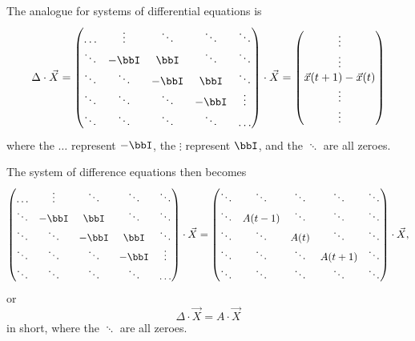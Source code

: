 \documentclass[a4paper, 12pt,oneside,openany]{book}
\begin{document}
The analogue for systems of differential equations is $$\Delta\cdot \vec{X}=\begin{pmatrix} \hdots & \vdots & \ddots & \ddots & \ddots \\ \ddots & -\bbI & \bbI & \ddots & \ddots \\ \ddots & \ddots & -\bbI & \bbI & \ddots \\ \ddots & \ddots & \ddots & -\bbI & \vdots \\ \ddots&\ddots&\ddots&\ddots&\hdots \end{pmatrix} \cdot \vec{X} = \begin{pmatrix} \vdots \\ \vdots \\ \vec{x}(t+1)-\vec{x}(t) \\ \vdots \\ \vdots \end{pmatrix}$$ where the $\hdots$ represent $-\bbI$, the $\vdots$ represent $\bbI$, and the $\ddots$ are all zeroes. 


The system of difference equations then becomes $$\begin{pmatrix} \hdots & \vdots & \ddots & \ddots & \ddots \\ \ddots & -\bbI & \bbI & \ddots & \ddots \\ \ddots & \ddots & -\bbI & \bbI & \ddots \\ \ddots & \ddots & \ddots & -\bbI & \vdots \\ \ddots&\ddots&\ddots&\ddots&\hdots \end{pmatrix} \cdot \vec{X} = \begin{pmatrix} \ddots & \ddots & \ddots & \ddots & \ddots \\ \ddots & A(t-1) & \ddots & \ddots & \ddots \\ \ddots & \ddots & A(t) & \ddots & \ddots \\ \ddots & \ddots & \ddots & A(t+1) & \ddots \\ \ddots&\ddots&\ddots&\ddots&\ddots \end{pmatrix} \cdot \vec{X},$$ or $$\Delta \cdot \vec{X} = A\cdot \vec{X}$$ in short, where the $\ddots$ are all zeroes.
\end{document}
